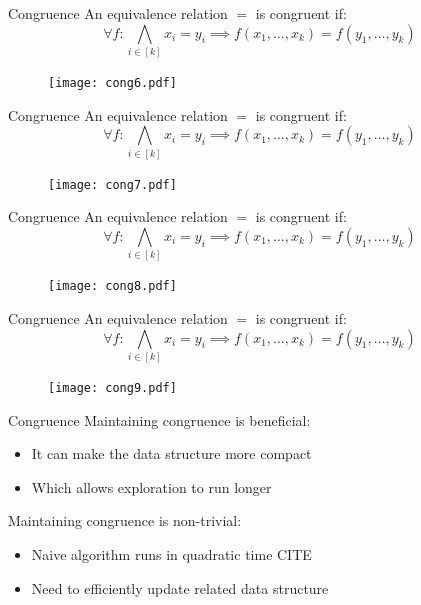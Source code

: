 \documentclass{beamer}
\begin{document}
  \begin{frame}{Congruence}
    An equivalence relation $=$ is congruent if:
 \[\forall f : \bigwedge_{i \in [k]} x_i = y_i \implies
  f(x_1, \ldots, x_k) = f(y_1, \ldots, y_k)\] 
  \begin{figure}
    \texttt{[image: cong6.pdf]}
  \end{figure}
  \end{frame}

  \begin{frame}{Congruence}
    An equivalence relation $=$ is congruent if:
 \[\forall f : \bigwedge_{i \in [k]} x_i = y_i \implies
  f(x_1, \ldots, x_k) = f(y_1, \ldots, y_k)\] 
  \begin{figure}
    \texttt{[image: cong7.pdf]}
  \end{figure}
  \end{frame}

  \begin{frame}{Congruence}
    An equivalence relation $=$ is congruent if:
 \[\forall f : \bigwedge_{i \in [k]} x_i = y_i \implies
  f(x_1, \ldots, x_k) = f(y_1, \ldots, y_k)\] 
  \begin{figure}
    \texttt{[image: cong8.pdf]}
  \end{figure}
  \end{frame}

  \begin{frame}{Congruence}
    An equivalence relation $=$ is congruent if:
 \[\forall f : \bigwedge_{i \in [k]} x_i = y_i \implies
  f(x_1, \ldots, x_k) = f(y_1, \ldots, y_k)\] 
  \begin{figure}
    \texttt{[image: cong9.pdf]}
  \end{figure}
  \end{frame}

  \begin{frame}{Congruence}
    Maintaining congruence is beneficial:
    \begin{itemize}
      \item It can make the data structure more compact 
      \item Which allows exploration to run longer \pause
    \end{itemize}
    Maintaining congruence is non-trivial:
    \begin{itemize}
      \item Naive algorithm runs in quadratic time CITE 
      \item Need to efficiently update related data structure
    \end{itemize}
  \end{frame}
\end{document}
